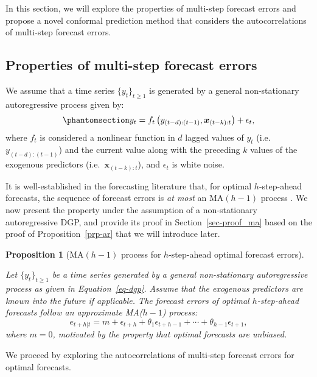 \documentclass[
  11pt,
  a4paper,
]{article}
\theoremstyle{plain}
\newtheorem{proposition}{Proposition}[section]
\theoremstyle{remark}
\begin{document}
In this section, we will explore the properties of multi-step forecast
errors and propose a novel conformal prediction method that considers
the autocorrelations of multi-step forecast errors.

\subsection{Properties of multi-step forecast errors}\label{sec-ppt}

We assume that a time series \(\{y_t\}_{t \geq 1}\) is generated by a
general non-stationary autoregressive process given by:
\begin{equation}\phantomsection\label{eq-dgp}{
y_t = f_{t}\left(y_{(t-d):(t-1)},\bm{x}_{(t-k):t}\right) + \epsilon_t,
}\end{equation} where \(f_{t}\) is considered a nonlinear function in
\(d\) lagged values of \(y_t\) (i.e.~\(y_{(t-d):(t-1)}\)) and the
current value along with the preceding \(k\) values of the exogenous
predictors (i.e.~\(\bm{x}_{(t-k):t}\)), and \(\epsilon_t\) is white
noise.

It is well-established in the forecasting literature that, for optimal
\(h\)-step-ahead forecasts, the sequence of forecast errors is \emph{at
most} an MA\((h-1)\) process \autocite{harvey1997,diebold2024}. We now
present the property under the assumption of a non-stationary
autoregressive DGP, and provide its proof in Section~\ref{sec-proof_ma}
based on the proof of Proposition~\ref{prp-ar} that we will introduce
later.

\begin{proposition}[MA\((h-1)\) process for \(h\)-step-ahead optimal
forecast errors]\protect\hypertarget{prp-ma}{}\label{prp-ma}

Let \(\{y_t\}_{t \geq 1}\) be a time series generated by a general
non-stationary autoregressive process as given in Equation~\ref{eq-dgp}.
Assume that the exogenous predictors are known into the future if
applicable. The forecast errors of optimal \(h\)-step-ahead forecasts
follow an approximate MA(\(h-1\)) process: \[
e_{t+h|t} = m + \epsilon_{t+h} + \theta_1\epsilon_{t+h-1} + \cdots + \theta_{h-1}\epsilon_{t+1},
\] where \(m=0\), motivated by the property that optimal forecasts are
unbiased.

\end{proposition}

We proceed by exploring the autocorrelations of multi-step forecast
errors for optimal forecasts.
\end{document}

